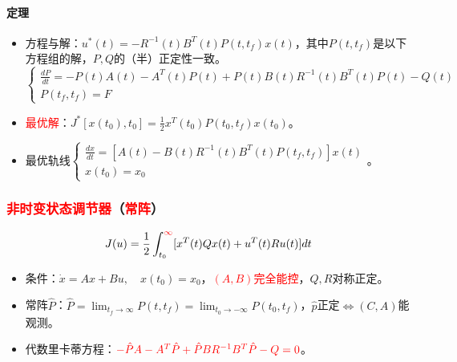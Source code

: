 \documentclass[
12pt, %
a4paper, 
oneside, %
]{scrartcl}
\begin{document}
\paragraph{定理}
\begin{itemize}
\item 方程与解：$ u^*(t) = -R^{-1}(t) B^T(t) P(t, t_f) x(t) $，其中$ P(t, t_f) $是以下方程组的解，$ P, Q $的（半）正定性一致。
$$ \begin{cases} \frac{d P}{d t} = -P(t) A(t) - A^T(t) P(t) + P(t) B(t) R^{-1}(t) B^T(t) P(t) - Q(t) \\ P(t_f, t_f) = F \end{cases} $$
\item \textcolor{red}{最优解}：$ J^*[x(t_0), t_0] = \frac{1}{2} x^T(t_0) P(t_0, t_f) x(t_0) $。
\item 最优轨线$ \begin{cases} \frac{d x}{d t} = [A(t) - B(t) R^{-1}(t) B^T(t) P(t_f, t_f)] x(t) \\ x(t_0) = x_0 \end{cases} $。
\end{itemize}
\subsubsection[非时变状态调节器]{\textcolor{red}{非时变状态调节器}（\textcolor{red}{常阵}）}
$$ J(u) = \frac{1}{2}\int_{t_0}^{\textcolor{red}{\infty}}[x^T(t) Q x(t) + u^T(t) R u(t)] d t $$
\begin{itemize}
\item 条件：$ \dot{x} = A x + B u, \quad x(t_0) = x_0 $，\textcolor{red}{$ (A, B) $完全能控}，$ Q, R $对称正定。
\item 常阵$ \hat{P} $：$ \hat{P} = \lim_{t_f \to \infty} P(t, t_f) = \lim_{t_0 \to -\infty} P(t_0, t_f) $，$ \hat{p} $正定$ \Leftrightarrow $$ (C, A) $能观测。
\item 代数里卡蒂方程：$ \textcolor{red}{-\hat{P} A - A^T \hat{P} + \hat{P} B R^{-1} B^T \hat{P} - Q = 0} $。
\end{itemize}
\end{document}
